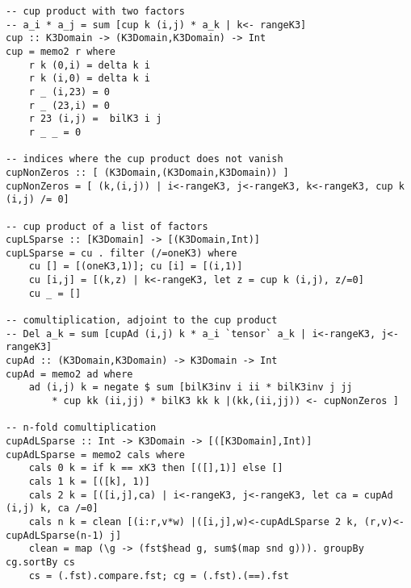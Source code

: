 \begin{lstlisting}
-- cup product with two factors
-- a_i * a_j = sum [cup k (i,j) * a_k | k<- rangeK3]
cup :: K3Domain -> (K3Domain,K3Domain) -> Int
cup = memo2 r where
	r k (0,i) = delta k i
	r k (i,0) = delta k i
	r _ (i,23) = 0
	r _ (23,i) = 0
	r 23 (i,j) =  bilK3 i j
	r _ _ = 0

-- indices where the cup product does not vanish
cupNonZeros :: [ (K3Domain,(K3Domain,K3Domain)) ]
cupNonZeros = [ (k,(i,j)) | i<-rangeK3, j<-rangeK3, k<-rangeK3, cup k (i,j) /= 0]

-- cup product of a list of factors
cupLSparse :: [K3Domain] -> [(K3Domain,Int)]
cupLSparse = cu . filter (/=oneK3) where
	cu [] = [(oneK3,1)]; cu [i] = [(i,1)]
	cu [i,j] = [(k,z) | k<-rangeK3, let z = cup k (i,j), z/=0]
	cu _ = []

-- comultiplication, adjoint to the cup product
-- Del a_k = sum [cupAd (i,j) k * a_i `tensor` a_k | i<-rangeK3, j<-rangeK3]
cupAd :: (K3Domain,K3Domain) -> K3Domain -> Int
cupAd = memo2 ad where 
	ad (i,j) k = negate $ sum [bilK3inv i ii * bilK3inv j jj 
		* cup kk (ii,jj) * bilK3 kk k |(kk,(ii,jj)) <- cupNonZeros ]

-- n-fold comultiplication
cupAdLSparse :: Int -> K3Domain -> [([K3Domain],Int)]
cupAdLSparse = memo2 cals where
	cals 0 k = if k == xK3 then [([],1)] else []
	cals 1 k = [([k], 1)]
	cals 2 k = [([i,j],ca) | i<-rangeK3, j<-rangeK3, let ca = cupAd (i,j) k, ca /=0]
	cals n k = clean [(i:r,v*w) |([i,j],w)<-cupAdLSparse 2 k, (r,v)<-cupAdLSparse(n-1) j]
	clean = map (\g -> (fst$head g, sum$(map snd g))). groupBy cg.sortBy cs  
	cs = (.fst).compare.fst; cg = (.fst).(==).fst

\end{lstlisting}
